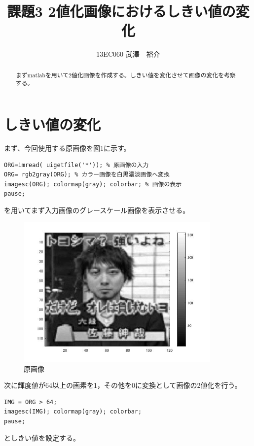 \documentclass{jsarticle}
\begin{document}
\title{課題3 2値化画像におけるしきい値の変化}
\author{13EC060 武澤　裕介}
\maketitle
\begin{abstract}
まずmatlabを用いて2値化画像を作成する。しきい値を変化させて画像の変化を考察する。
\end{abstract}
\section{しきい値の変化}
まず、今回使用する原画像を図1に示す。
\begin{lstlisting}[basicstyle=\ttfamily\footnotesize, frame=single]
ORG=imread( uigetfile('*')); % 原画像の入力
ORG= rgb2gray(ORG); % カラー画像を白黒濃淡画像へ変換
imagesc(ORG); colormap(gray); colorbar; % 画像の表示
pause;
 \end{lstlisting}
を用いてまず入力画像のグレースケール画像を表示させる。

\begin{figure}[htbp]
 \begin{center}
  \includegraphics[width=10cm]{kadai3-0.jpg}
 \end{center}
 \caption{原画像}
\end{figure}

次に輝度値が64以上の画素を1，その他を0に変換として画像の2値化を行う。
\begin{lstlisting}[basicstyle=\ttfamily\footnotesize, frame=single]
IMG = ORG > 64;
imagesc(IMG); colormap(gray); colorbar;
pause;
 \end{lstlisting}
としきい値を設定する。
\end{document}
